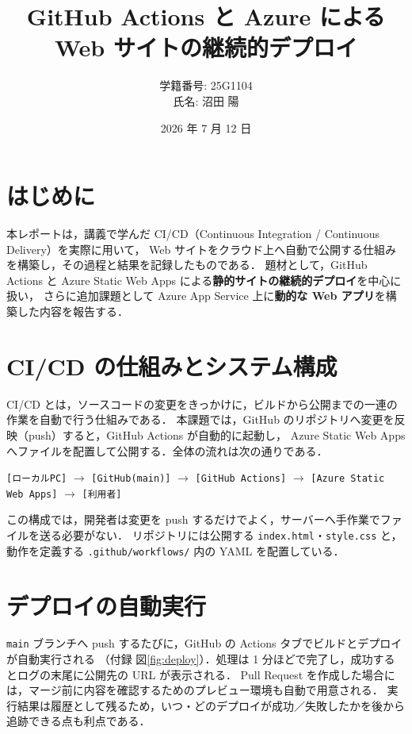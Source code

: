 \documentclass[uplatex,dvipdfmx,a4paper,11pt]{jsarticle}
\title{GitHub Actions と Azure による Web サイトの継続的デプロイ}
\author{学籍番号: 25G1104\\ 氏名: 沼田 陽}
\date{2026 年 7 月 12 日}
\begin{document}
\maketitle

\section{はじめに}
本レポートは，講義で学んだ CI/CD（Continuous Integration / Continuous Delivery）を実際に用いて，
Web サイトをクラウド上へ自動で公開する仕組みを構築し，その過程と結果を記録したものである．
題材として，GitHub Actions と Azure Static Web Apps による\textbf{静的サイトの継続的デプロイ}を中心に扱い，
さらに追加課題として Azure App Service 上に\textbf{動的な Web アプリ}を構築した内容を報告する．

\section{CI/CD の仕組みとシステム構成}
CI/CD とは，ソースコードの変更をきっかけに，ビルドから公開までの一連の作業を自動で行う仕組みである．
本課題では，GitHub のリポジトリへ変更を反映（push）すると，GitHub Actions が自動的に起動し，
Azure Static Web Apps へファイルを配置して公開する．全体の流れは次の通りである．

\begin{center}
\small
\texttt{[ローカルPC]} $\longrightarrow$ \texttt{[GitHub(main)]}
$\longrightarrow$ \texttt{[GitHub Actions]} $\longrightarrow$ \texttt{[Azure Static Web Apps]}
$\longrightarrow$ \texttt{[利用者]}
\end{center}

\noindent
この構成では，開発者は変更を push するだけでよく，サーバーへ手作業でファイルを送る必要がない．
リポジトリには公開する \texttt{index.html}・\texttt{style.css} と，動作を定義する
\texttt{.github/workflows/} 内の YAML を配置している．

\section{デプロイの自動実行}
\texttt{main} ブランチへ push するたびに，GitHub の Actions タブでビルドとデプロイが自動実行される
（付録 図\ref{fig:deploy}）．処理は 1 分ほどで完了し，成功するとログの末尾に公開先の URL が表示される．
Pull Request を作成した場合には，マージ前に内容を確認するためのプレビュー環境も自動で用意される．
実行結果は履歴として残るため，いつ・どのデプロイが成功／失敗したかを後から追跡できる点も利点である．
\end{document}
